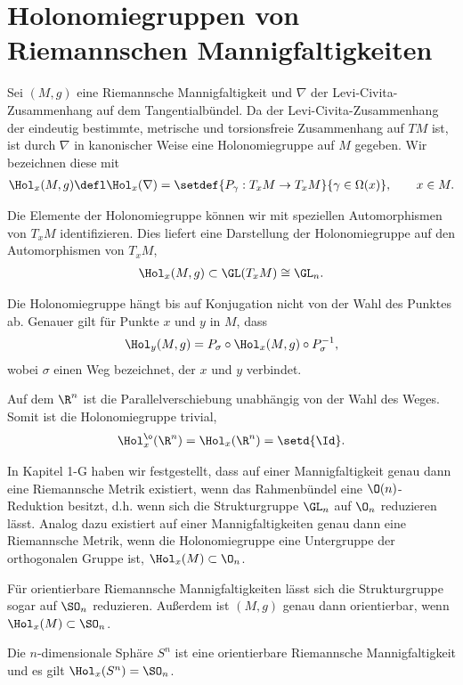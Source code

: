 \documentclass[%
	paper=a5,%
	fleqn,%
	DIV=18,%
	BCOR=0mm,
	fontsize=11pt,
	titlepage=false,%
	bibliography=totoc,
	DIV=18,%
	twoside=true,
	pdftitle=Riemannsche Geometrie,
	pdfauthor=Uwe Semmelmann,
	numbers=noendperiod]%
	{scrbook}
\begin{document}
\section{Holonomiegruppen von Riemannschen Mannigfaltigkeiten}

Sei $(M,g)$ eine Riemannsche Mannigfaltigkeit und $\nabla$ der Levi-Civita-Zusammenhang auf dem Tangentialbündel. Da der Levi-Civita-Zusammenhang der eindeutig bestimmte, metrische und torsionsfreie Zusammenhang auf $TM$ ist, ist durch $\nabla$ in kanonischer Weise eine Holonomiegruppe auf $M$ gegeben. Wir bezeichnen diese mit
\begin{align*}
\Hol_{x}(M,g) \defl \Hol_{x}(\nabla) = 
\setdef{P_{\gamma} : T_{x}M\to T_{x}M}{\gamma\in\Omega(x)},\qquad x\in M.
\end{align*}

Die Elemente der Holonomiegruppe können wir mit speziellen Automorphismen von $T_{x}M$ identifizieren. Dies liefert eine Darstellung der Holonomiegruppe auf den Automorphismen von $T_{x}M$,
\begin{align*}
\Hol_{x}(M,g) \subset \GL(T_{x}M) \cong \GL_{n}.
\end{align*}

\begin{rem}
Die Holonomiegruppe hängt bis auf Konjugation nicht von der Wahl des Punktes ab. Genauer gilt für Punkte $x$ und $y$ in $M$, dass
\begin{align*}
\Hol_{y}(M,g) = P_{\sigma}\circ \Hol_{x}(M,g) \circ P_{\sigma}^{-1},
\end{align*}
wobei $\sigma$ einen Weg bezeichnet, der $x$ und $y$ verbindet.\map
\end{rem}

\begin{ex}
\begin{exenum}
 \item Auf dem $\R^n$ ist die Parallelverschiebung unabhängig von der Wahl des Weges. Somit ist die Holonomiegruppe trivial,
 \begin{align*}
\Hol_{x}^\o(\R^n) = \Hol_{x}(\R^n) = \setd{\Id}.
\end{align*}
\item In Kapitel 1-G haben wir festgestellt, dass auf einer Mannigfaltigkeit genau dann eine Riemannsche Metrik existiert, wenn das Rahmenbündel eine $\O(n)$-Reduktion besitzt, d.h. wenn sich die Strukturgruppe $\GL_{n}$ auf $\O_{n}$ reduzieren lässt. Analog dazu existiert auf einer Mannigfaltigkeiten genau dann eine Riemannsche Metrik, wenn die Holonomiegruppe eine Untergruppe der orthogonalen Gruppe ist, $\Hol_{x}(M) \subset \O_{n}$.

Für orientierbare Riemannsche Mannigfaltigkeiten lässt sich die Strukturgruppe sogar auf $\SO_{n}$ reduzieren. Außerdem ist $(M,g)$ genau dann orientierbar, wenn $\Hol_{x}(M)\subset \SO_{n}$.
\item Die $n$-dimensionale Sphäre $S^n$ ist eine orientierbare Riemannsche Mannigfaltigkeit und es gilt $\Hol_{x}(S^n) = \SO_{n}$.\boxc
\end{exenum}
\end{ex}
\end{document}
